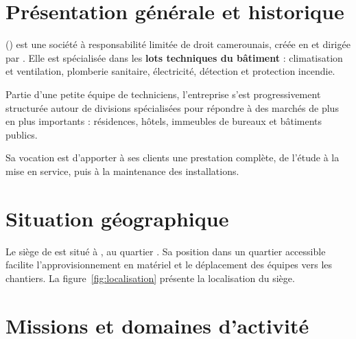 

\section{Présentation générale et historique}

\InfoEntreprise{} (\InfoEntrepriseSigle) est une société à responsabilité limitée de droit
camerounais, créée en \InfoEntrepriseCreation{} et dirigée par \InfoEntrepriseDirigeant. Elle
est spécialisée dans les \textbf{lots techniques du bâtiment} : climatisation et ventilation,
plomberie sanitaire, électricité, détection et protection incendie.

Partie d'une petite équipe de techniciens, l'entreprise s'est progressivement structurée
autour de divisions spécialisées pour répondre à des marchés de plus en plus importants :
résidences, hôtels, immeubles de bureaux et bâtiments publics. 

Sa vocation est d'apporter à ses clients une prestation complète, de l'étude à la mise en
service, puis à la maintenance des installations.

\section{Situation géographique}

Le siège de \InfoEntrepriseSigle{} est situé à \InfoEntrepriseVille, au quartier
\InfoEntrepriseQuartier. Sa position dans un quartier accessible facilite l'approvisionnement
en matériel et le déplacement des équipes vers les chantiers. La figure~\ref{fig:localisation}
présente la localisation du siège.


\section{Missions et domaines d'activité}

